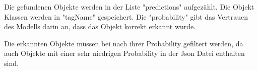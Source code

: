 Die gefundenen Objekte werden in der Liste "predictions" aufgezählt. Die Objekt Klassen werden in "tagName" gespeichert. Die "probability" gibt das Vertrauen des Modells darin an, dass das Objekt korrekt erkannt wurde.

Die erkannten Objekte müssen bei nach ihrer Probability gefiltert werden, da auch Objekte mit einer sehr niedrigen Probability in der Json Datei enthalten sind. 